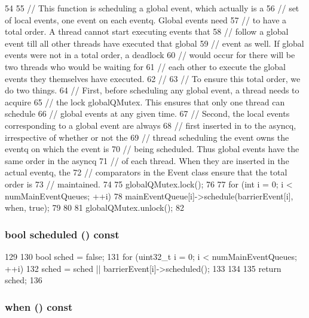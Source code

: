 \begin{DoxyCode}
54 {
55     // This function is scheduling a global event, which actually is a
56     // set of local events, one event on each eventq. Global events need
57     // to have a total order. A thread cannot start executing events that
58     // follow a global event till all other threads have executed that global
59     // event as well. If global events were not in a total order, a deadlock
60     // would occur for there will be two threads who would be waiting for
61     // each other to execute the global events they themselves have executed.
62     //
63     // To ensure this total order, we do two things.
64     // First, before scheduling any global event, a thread needs to acquire
65     // the lock globalQMutex. This ensures that only one thread can schedule
66     // global events at any given time.
67     // Second, the local events corresponding to a global event are always
68     // first inserted in to the asyncq, irrespective of whether or not the
69     // thread scheduling the event owns the eventq on which the event is
70     // being scheduled. Thus global events have the same order in the asyncq
71     // of each thread. When they are inserted in the actual eventq, the
72     // comparators in the Event class ensure that the total order is
73     // maintained.
74 
75     globalQMutex.lock();
76 
77     for (int i = 0; i < numMainEventQueues; ++i) {
78         mainEventQueue[i]->schedule(barrierEvent[i], when, true);
79     }
80 
81     globalQMutex.unlock();
82 }
\end{DoxyCode}
\hypertarget{classBaseGlobalEvent_a9cd69a6b10cb037550943f177a0da688}{
\subsubsection[{scheduled}]{\setlength{\rightskip}{0pt plus 5cm}bool scheduled () const}}
\label{classBaseGlobalEvent_a9cd69a6b10cb037550943f177a0da688}



\begin{DoxyCode}
129     {
130         bool sched = false;
131         for (uint32_t i = 0; i < numMainEventQueues; ++i) {
132             sched = sched || barrierEvent[i]->scheduled();
133         }
134 
135         return sched;
136     }
\end{DoxyCode}
\hypertarget{classBaseGlobalEvent_a1883243a0117678c5695f2435dcabbdc}{
\subsubsection[{when}]{ when () const}}
\label{classBaseGlobalEvent_a1883243a0117678c5695f2435dcabbdc}



